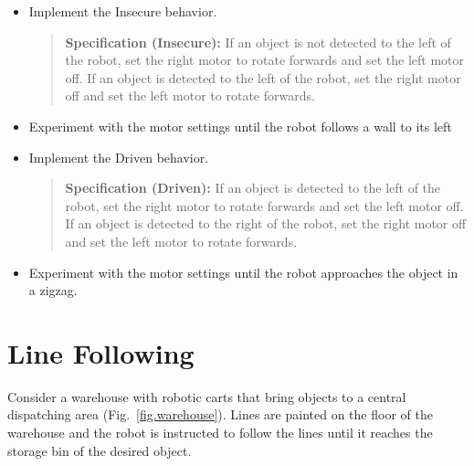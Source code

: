 \begin{framed}
\begin{itemize}
\item Implement the Insecure behavior.
\begin{quote}
\normalsize\noindent\textbf{Specification (Insecure):} If an object is not detected to the left of the robot, set the right motor to rotate forwards and set the left motor off. If an object is detected to the left of the robot, set the right motor off and set the left motor to rotate forwards.
\end{quote}
\item Experiment with the motor settings until the robot follows a wall to its left
\end{itemize}
\end{framed}

\begin{framed}
\begin{itemize}
\item Implement the Driven behavior.
\begin{quote}
\normalsize\noindent\textbf{Specification (Driven):} If an object is detected to the left of the robot, set the right motor to rotate forwards and set the left motor off. If an object is detected to the right of the robot,  set the right motor off and set the left motor to rotate forwards.
\end{quote}
\item Experiment with the motor settings until the robot approaches the object in a zigzag.
\end{itemize}
\end{framed}


\section{Line Following}\label{s.line}

Consider a warehouse with robotic carts that bring objects to a central dispatching area (Fig.~\ref{fig.warehouse}). Lines are painted on the floor of the warehouse and the robot is instructed to follow the lines until it reaches the storage bin of the desired object.

